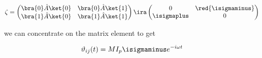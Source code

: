 \begin{equation}\label{eq:couple18}
  \zeta = \begin{pmatrix}
    \bra{0}\hat{A}\ket{0} & \bra{0}\hat{A}\ket{1} \\
    \bra{1}\hat{A}\ket{0} & \bra{1}\hat{A}\ket{1} \\
  \end{pmatrix} \ira \begin{pmatrix} 0 & \red{\isigmaminus}\\\isigmaplus&0
  \end{pmatrix}
\end{equation}

\noindent we can concentrate on the  matrix element to get

\begin{equation}\label{dipole_2level}
  \vartheta_{ij}(t) = MI_p\isigmaminus e^{-i\omega t}
\end{equation}

\newpage